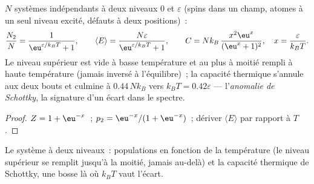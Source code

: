 \begin{proposition}\label{prop:b2:boltzmann-factor:twolevel}
$N$ systèmes indépendants à deux niveaux $0$ et $\varepsilon$ (spins dans un
champ, atomes à un seul niveau excité, défauts à deux positions)~:
\[
\frac{N_2}{N} = \frac{1}{\eu^{\varepsilon/k_BT} + 1}, \qquad
\langle E\rangle = \frac{N\varepsilon}{\eu^{\varepsilon/k_BT} + 1}, \qquad
C = Nk_B\,\frac{x^2\eu^x}{(\eu^x + 1)^2}, \quad x = \frac{\varepsilon}{k_BT} .
\]
Le niveau supérieur est vide à basse température et au plus à moitié rempli à
haute température (jamais inversé à l'équilibre)~; la capacité thermique
s'annule aux deux bouts et culmine à $0.44\,Nk_B$ vers $k_BT = 0.42
\varepsilon$ --- l'\emph{anomalie de Schottky}, la
signature d'un écart dans le spectre.
\end{proposition}

\begin{proof}
$Z = 1 + \eu^{-x}$~; $p_2 = \eu^{-x}/(1 + \eu^{-x})$~; dériver $\langle
E\rangle$ par rapport à $T$.
\end{proof}

\begin{omfigure}

{\small Le système à deux niveaux~: populations en fonction de la température (le
niveau supérieur se remplit jusqu'à la moitié, jamais au-delà) et la capacité
thermique de Schottky, une bosse là où $k_BT$ vaut l'écart.}
\end{omfigure}

